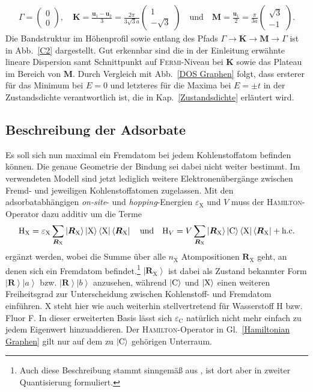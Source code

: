\documentclass[a4paper, 10pt, twoside, openany]{book} %
\newcommand \bra[1]{\left \langle #1 \right |}
\newcommand \ket[1]{\left | #1 \right \rangle}
\def \vec {\boldsymbol}
\newcommand \op[1]{\mathrm{#1}}
\newcommand \mat[1]{\begin{pmatrix} #1 \end{pmatrix}}
\def \eC {\varepsilon_\mathrm{C}}
\def \eX {\varepsilon_\mathrm{X}}
\def \nX {n_\mathrm{X}}
\begin{document}
	\begin{align*}
		\vec \varGamma = \mat{0 \\ 0}, \quad \vec K = \frac {\vec u_1 - \vec u_2} 3 = \frac{2 \pi}{3 \sqrt 3 a} \mat{1 \\ -\sqrt 3} \quad \text{und} \quad \vec M = \frac {\vec u_1} 2 = \frac \pi {3 a} \mat{\sqrt 3 \\ -1}.
	\end{align*}
	Die Bandstruktur im Höhenprofil sowie entlang des Pfads $\vec \varGamma \rightarrow \vec K \rightarrow \vec M \rightarrow \vec \varGamma$ ist in Abb.~\ref{C2} dargestellt. Gut erkennbar sind die in der Einleitung erwähnte lineare Dispersion samt Schnittpunkt auf \textsc{Fermi}-Niveau bei $\vec K$ sowie das Plateau im Bereich von $\vec M$. Durch Vergleich mit Abb.~\ref{DOS Graphen} folgt, dass ersterer für das Minimum bei $E = 0$ und letzteres für die Maxima bei $E = \pm t$ in der Zustandsdichte verantwortlich ist, die in Kap.~\ref{Zustandsdichte} erläutert wird.
	
	\subsection{Beschreibung der Adsorbate}
	
	Es soll sich nun maximal ein Fremdatom bei jedem Kohlenstoffatom befinden können. Die genaue Geometrie der Bindung sei dabei nicht weiter bestimmt. Im verwendeten Modell sind jetzt lediglich weitere Elektronenübergänge zwischen Fremd- und jeweiligen Kohlenstoffatomen zugelassen. Mit den adsorbatabhängigen \emph{on-site}- und \emph{hopping}-Energien $\eX$ und $V$ muss der \textsc{Hamilton}-Operator dazu additiv um die Terme
	\begin{align*}
		\op H_\text{X} = \eX \sum_{\vec R_\text{X}} \ket{\vec R_\text{X}} \ket{\rm X} \bra{\rm X} \bra{\vec R_\text{X}} \quad \text{und} \quad \op H_V = V \sum_{\vec R_\text{X}} \ket{\vec R_\text{X}} \ket{\rm C} \bra{\rm X} \bra{\vec R_\text{X}} + \text{h.c.}
	\end{align*}
	ergänzt werden, wobei die Summe über alle $\nX$ Atompositionen $\vec R_\text{X}$ geht, an denen sich ein Fremdatom befindet.\footnote{Auch diese Beschreibung stammt sinngemäß aus \cite[S.~2]{Wehling2}, ist dort aber in zweiter Quantisierung formuliert.} $\ket{\vec R_\text{X}}$ ist dabei als Zustand bekannter Form $\ket{\vec R} \ket a$ bzw. $\ket{\vec R} \ket b$ anzusehen, während $\ket{\rm C}$ und $\ket{\rm X}$ einen weiteren Freiheitsgrad zur Unterscheidung zwischen Kohlenstoff- und Fremdatom einführen. X steht hier wie auch weiterhin stellvertretend für Wasserstoff H bzw. Fluor F. In dieser erweiterten Basis lässt sich $\eC$ natürlich nicht mehr einfach zu jedem Eigenwert hinzuaddieren. Der \textsc{Hamilton}-Operator in Gl.~\ref{Hamiltonian Graphen} gilt nur auf dem zu $\ket{\rm C}$ gehörigen Unterraum.
	
\end{document}
